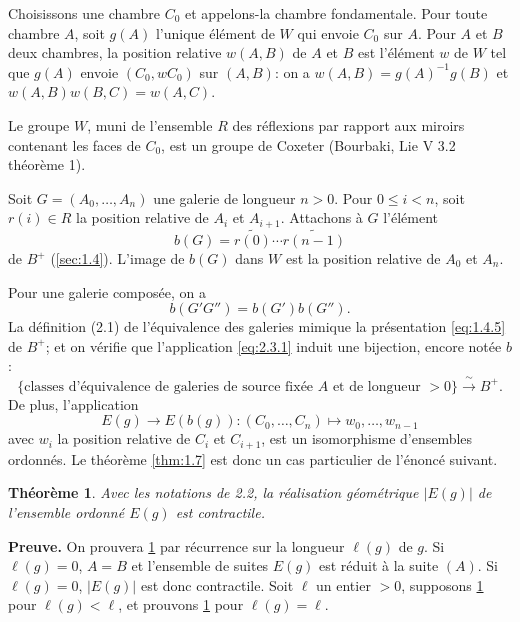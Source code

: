 \documentclass[11pt,a4paper]{article}
\theoremstyle{plain}
\newtheorem{theorem}{Th\'eor\`eme}[section]
\theoremstyle{definition}
\begin{document}
Choisissons une chambre $C_0$ et appelons-la chambre fondamentale. Pour toute chambre $A$, soit $g(A)$ l'unique \'el\'ement de $W$ qui envoie $C_0$ sur $A$. Pour $A$ et $B$ deux chambres, la position relative $w(A,B)$ de $A$ et $B$ est l'\'el\'ement $w$ de $W$ tel que $g(A)$ envoie $(C_0, wC_0)$ sur $(A,B)$: on a $w(A,B) = g(A)^{-1} g(B)$ et $w(A,B) w(B,C) = w(A,C)$.

Le groupe $W$, muni de l'ensemble $R$ des r\'eflexions par rapport aux miroirs contenant les faces de $C_0$, est un groupe de Coxeter (Bourbaki, Lie V 3.2 th\'eor\`eme 1).

Soit $G = (A_0, \ldots, A_n)$ une galerie de longueur $n > 0$. Pour $0 \leq i < n$, soit $r(i) \in R$ la position relative de $A_i$ et $A_{i+1}$. Attachons \`a $G$ l'\'el\'ement
\begin{equation}\label{eq:2.3.1}
b(G) = \widetilde{r(0)} \cdots \widetilde{r(n-1)}
\tag{2.3.1}
\end{equation}
de $B^+$ (\ref{sec:1.4}). L'image de $b(G)$ dans $W$ est la position relative de $A_0$ et $A_n$.

Pour une galerie compos\'ee, on a
\begin{equation}\label{eq:2.3.2}
b(G' G'') = b(G') b(G'').
\tag{2.3.2}
\end{equation}
La d\'efinition (2.1) de l'\'equivalence des galeries mimique la pr\'esentation \eqref{eq:1.4.5} de $B^+$; et on v\'erifie que l'application \eqref{eq:2.3.1} induit une bijection, encore not\'ee $b$:
\begin{equation}\label{eq:2.3.3}
\{\text{classes d'\'equivalence de galeries de source fix\'ee } A \text{ et de longueur } > 0\} \xrightarrow{\;\sim\;} B^+.
\tag{2.3.3}
\end{equation}
De plus, l'application
\[
E(g) \to E(b(g)) : (C_0, \ldots, C_n) \mapsto w_0, \ldots, w_{n-1}
\]
avec $w_i$ la position relative de $C_i$ et $C_{i+1}$, est un isomorphisme d'ensembles ordonn\'es. Le th\'eor\`eme \ref{thm:1.7} est donc un cas particulier de l'\'enonc\'e suivant.

\begin{theorem}\label{thm:2.4}
Avec les notations de 2.2, la r\'ealisation g\'eom\'etrique $|E(g)|$ de l'ensemble ordonn\'e $E(g)$ est contractile.
\end{theorem}

\noindent\textbf{Preuve.} On prouvera \ref{thm:2.4} par r\'ecurrence sur la longueur $\ell(g)$ de $g$. Si $\ell(g) = 0$, $A = B$ et l'ensemble de suites $E(g)$ est r\'eduit \`a la suite $(A)$. Si $\ell(g) = 0$, $|E(g)|$ est donc contractile. Soit $\ell$ un entier $> 0$, supposons \ref{thm:2.4} pour $\ell(g) < \ell$, et prouvons \ref{thm:2.4} pour $\ell(g) = \ell$.
\end{document}
